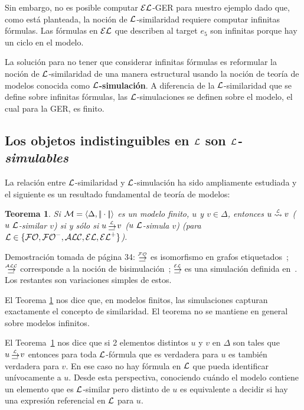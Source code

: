 Sin embargo, no es posible computar $\mathcal{EL}$-GER para nuestro ejemplo dado que, como est\'a planteada, la noci\'on de $\mathcal{L}$-similaridad requiere computar infinitas f\'ormulas. Las f\'ormulas en $\mathcal{EL}$ que describen al target $e_5$ son infinitas porque hay un ciclo en el modelo.

La soluci\'on para no tener que considerar infinitas f\'ormulas es reformular la noci\'on de $\mathcal{L}$-similaridad de una manera estructural usando la noci\'on de teor\'ia de modelos conocida como {\bf $\mathcal{L}$-simulaci\'on}. A diferencia de la $\mathcal{L}$-similaridad que se define sobre infinitas f\'ormulas, las $\mathcal{L}$-simulaciones se definen sobre el modelo, el cual para la GER, es finito.

\subsection{Los objetos indistinguibles en $\mathcal{L}$ son \emph{$\mathcal{L}$-simulables}}

La relaci\'on entre $\mathcal{L}$-similaridad y $\mathcal{L}$-simulaci\'on ha sido ampliamente estudiada y el siguiente es un resultado fundamental de teor\'ia de modelos:


\newtheorem{teorema}{Teorema}
\begin{teorema} \label{thm:simulation}
Si  $\mathcal{M} = \langle \Delta, |\!|\cdot|\!| \rangle$ es un modelo finito, $u$ y $v \in \Delta$, entonces $u \simil{\+L} v$ ($u~\mathcal{L}$-similar $v$) si y s\'olo si 
$u \simul{\+L} v$ ($u~\mathcal{L}$-simula $v$) (para $\mathcal{L} \in \{\mathcal{FO},{\mathcal{FO}^-},\mathcal{ALC},\mathcal{EL},{\mathcal{EL}^+}\}$).
\end{teorema}

Demostraci\'on tomada de \cite{arec:usin11} p\'agina 34: $\simul{\FOL}$ es isomorfismo en
grafos etiquetados~\cite{ebbi:math96}; $\simul{\ALC}$ corresponde a la
noci\'on de bisimulaci\'on~\cite[Def.~2.16]{BRV01}; $\simul{\EL}$ es una
simulaci\'on definida en~\cite[Def.~2.77]{BRV01}. Los restantes son variaciones simples de estos.

El Teorema \ref{thm:simulation} nos dice que, en modelos finitos, las simulaciones capturan exactamente el concepto de similaridad. El teorema no se mantiene en general sobre modelos infinitos.

El Teorema~\ref{thm:simulation} nos dice que si 2 elementos distintos $u$ y $v$ en $\Delta$ son tales que $u
\simul{\+L} v$ entonces para toda $\mathcal{L}$-f\'ormula que es verdadera para $u$ es tambi\'en verdadera para $v$. En ese caso no hay f\'ormula en $\mathcal{L}$ que pueda identificar un\'ivocamente a $u$. Desde esta perspectiva, conociendo cu\'ando el modelo contiene un elemento que es $\mathcal{L}$-similar pero distinto de $u$ es
equivalente a decidir si hay una expresi\'on referencial en $\mathcal{L}$ para $u$.

